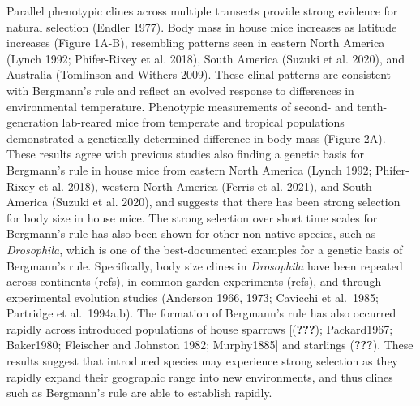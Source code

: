 \documentclass[]{article}
\begin{document}
Parallel phenotypic clines across multiple transects provide strong
evidence for natural selection (Endler 1977). Body mass in house mice
increases as latitude increases (Figure 1A-B), resembling patterns seen
in eastern North America (Lynch 1992; Phifer-Rixey et al. 2018), South
America (Suzuki et al. 2020), and Australia (Tomlinson and Withers
2009). These clinal patterns are consistent with Bergmann's rule and
reflect an evolved response to differences in environmental temperature.
Phenotypic measurements of second- and tenth-generation lab-reared mice
from temperate and tropical populations demonstrated a genetically
determined difference in body mass (Figure 2A). These results agree with
previous studies also finding a genetic basis for Bergmann's rule in
house mice from eastern North America (Lynch 1992; Phifer-Rixey et al.
2018), western North America (Ferris et al. 2021), and South America
(Suzuki et al. 2020), and suggests that there has been strong selection
for body size in house mice. The strong selection over short time scales
for Bergmann's rule has also been shown for other non-native species,
such as \emph{Drosophila}, which is one of the best-documented examples
for a genetic basis of Bergmann's rule. Specifically, body size clines
in \emph{Drosophila} have been repeated across continents (refs), in
common garden experiments (refs), and through experimental evolution
studies (Anderson 1966, 1973; Cavicchi et al.~1985; Partridge et
al.~1994a,b). The formation of Bergmann's rule has also occurred rapidly
across introduced populations of house sparrows {[}({\textbf{???}});
Packard1967; Baker1980; Fleischer and Johnston 1982; Murphy1885{]} and
starlings ({\textbf{???}}). These results suggest that introduced
species may experience strong selection as they rapidly expand their
geographic range into new environments, and thus clines such as
Bergmann's rule are able to establish rapidly.
\end{document}
